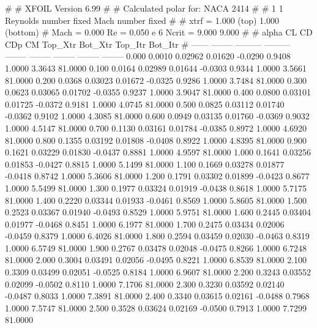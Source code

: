 #  
#       XFOIL         Version 6.99
#  
# Calculated polar for: NACA 2414                                       
#  
# 1 1 Reynolds number fixed          Mach number fixed         
#  
# xtrf =   1.000 (top)        1.000 (bottom)  
# Mach =   0.000     Re =     0.050 e 6     Ncrit =   9.000  9.000
#  
#   alpha    CL        CD       CDp       CM     Top_Xtr  Bot_Xtr  Top_Itr  Bot_Itr
#  ------ -------- --------- --------- -------- -------- -------- -------- --------
   0.000   0.0010   0.02962   0.01620  -0.0290   0.9408   1.0000   3.3643  81.0000
   0.100   0.0164   0.02989   0.01644  -0.0303   0.9344   1.0000   3.5661  81.0000
   0.200   0.0368   0.03023   0.01672  -0.0325   0.9286   1.0000   3.7484  81.0000
   0.300   0.0623   0.03065   0.01702  -0.0355   0.9237   1.0000   3.9047  81.0000
   0.400   0.0800   0.03101   0.01725  -0.0372   0.9181   1.0000   4.0745  81.0000
   0.500   0.0825   0.03112   0.01740  -0.0362   0.9102   1.0000   4.3085  81.0000
   0.600   0.0949   0.03135   0.01760  -0.0369   0.9032   1.0000   4.5147  81.0000
   0.700   0.1130   0.03161   0.01784  -0.0385   0.8972   1.0000   4.6920  81.0000
   0.800   0.1355   0.03192   0.01808  -0.0408   0.8922   1.0000   4.8395  81.0000
   0.900   0.1621   0.03229   0.01830  -0.0437   0.8881   1.0000   4.9597  81.0000
   1.000   0.1641   0.03256   0.01853  -0.0427   0.8815   1.0000   5.1499  81.0000
   1.100   0.1669   0.03278   0.01877  -0.0418   0.8742   1.0000   5.3606  81.0000
   1.200   0.1791   0.03302   0.01899  -0.0423   0.8677   1.0000   5.5499  81.0000
   1.300   0.1977   0.03324   0.01919  -0.0438   0.8618   1.0000   5.7175  81.0000
   1.400   0.2220   0.03344   0.01933  -0.0461   0.8569   1.0000   5.8605  81.0000
   1.500   0.2523   0.03367   0.01940  -0.0493   0.8529   1.0000   5.9751  81.0000
   1.600   0.2445   0.03404   0.01977  -0.0468   0.8451   1.0000   6.1977  81.0000
   1.700   0.2475   0.03434   0.02006  -0.0459   0.8379   1.0000   6.4026  81.0000
   1.800   0.2594   0.03459   0.02030  -0.0463   0.8319   1.0000   6.5749  81.0000
   1.900   0.2767   0.03478   0.02048  -0.0475   0.8266   1.0000   6.7248  81.0000
   2.000   0.3004   0.03491   0.02056  -0.0495   0.8221   1.0000   6.8539  81.0000
   2.100   0.3309   0.03499   0.02051  -0.0525   0.8184   1.0000   6.9607  81.0000
   2.200   0.3243   0.03552   0.02099  -0.0502   0.8110   1.0000   7.1706  81.0000
   2.300   0.3230   0.03592   0.02140  -0.0487   0.8033   1.0000   7.3891  81.0000
   2.400   0.3340   0.03615   0.02161  -0.0488   0.7968   1.0000   7.5747  81.0000
   2.500   0.3528   0.03624   0.02169  -0.0500   0.7913   1.0000   7.7299  81.0000

